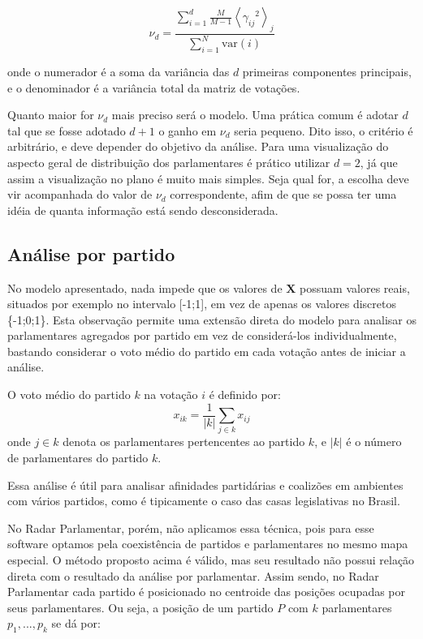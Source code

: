 \documentclass[a4paper, 12pt]{article}
\begin{document}
\begin{equation}
\nu_d = \frac{\sum_{i=1}^{d}\frac{M}{M-1} \left< {\gamma_{ij}}^{2} \right>_j } {\sum_{i=1}^N \mathrm{var}(i)}
\label{eq:porcentagem-variancia}
\end{equation}

onde o numerador é a soma da variância das $d$ primeiras componentes principais, e o denominador é a variância total da matriz de votações.

Quanto maior for $\nu_d$ mais preciso será o modelo. Uma prática comum é adotar $d$ tal que se fosse adotado $d+1$ o ganho em $\nu_d$ seria pequeno. Dito isso, o critério é arbitrário, e deve depender do objetivo da análise. Para uma visualização do aspecto geral de distribuição dos parlamentares é prático utilizar $d=2$, já que assim a visualização no plano é muito mais simples. Seja qual for, a escolha deve vir acompanhada do valor de $\nu_d$ correspondente, afim de que se possa ter uma idéia de quanta informação está sendo desconsiderada.

\subsection{Análise por partido}

No modelo apresentado, nada impede que os valores de $\mathbf{X}$ possuam valores reais, situados por exemplo no intervalo [-1;1], em vez de apenas os valores discretos \{-1;0;1\}. Esta observação permite uma extensão direta do modelo para analisar os parlamentares agregados por partido em vez de considerá-los individualmente, bastando considerar o voto médio do partido em cada votação antes de iniciar a análise.

O voto médio do partido $k$ na votação $i$ é definido por:
\begin{equation}
  x_{ik} = \frac{1}{|k|}\sum_{j\in k} x_{ij}
  \label{eq:voto-partido}
\end{equation}
onde $j \in k$ denota os parlamentares pertencentes ao partido $k$, e $|k|$ é o número de parlamentares do partido $k$.

Essa análise é útil para analisar afinidades partidárias e coalizões em ambientes com vários partidos, como é tipicamente o caso das casas legislativas no Brasil.

No Radar Parlamentar, porém, não aplicamos essa técnica, pois para esse software optamos pela coexistência de partidos e parlamentares no mesmo mapa especial. O método proposto acima é válido, mas seu resultado não possui relação direta com o resultado da análise por parlamentar. Assim sendo, no Radar Parlamentar cada partido é posicionado no centroide das posições ocupadas por seus parlamentares. Ou seja, a posição de um partido $P$ com $k$ parlamentares $p_1, ..., p_k$ se dá por:
\end{document}
